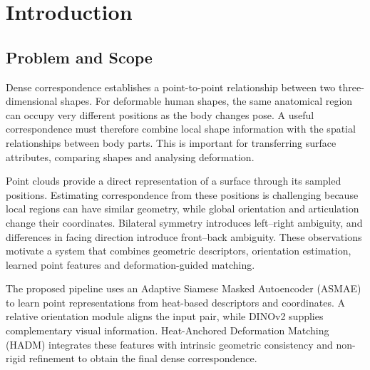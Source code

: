 \chapter{Introduction}
\label{Chapter1}

\section{Problem and Scope}
Dense correspondence establishes a point-to-point relationship between two three-dimensional shapes. For deformable human shapes, the same anatomical region can occupy very different positions as the body changes pose. A useful correspondence must therefore combine local shape information with the spatial relationships between body parts. This is important for transferring surface attributes, comparing shapes and analysing deformation.

Point clouds provide a direct representation of a surface through its sampled positions. Estimating correspondence from these positions is challenging because local regions can have similar geometry, while global orientation and articulation change their coordinates. Bilateral symmetry introduces left--right ambiguity, and differences in facing direction introduce front--back ambiguity. These observations motivate a system that combines geometric descriptors, orientation estimation, learned point features and deformation-guided matching.

The proposed pipeline uses an Adaptive Siamese Masked Autoencoder (ASMAE) to learn point representations from heat-based descriptors and coordinates. A relative orientation module aligns the input pair, while DINOv2 supplies complementary visual information. Heat-Anchored Deformation Matching (HADM) integrates these features with intrinsic geometric consistency and non-rigid refinement to obtain the final dense correspondence.
